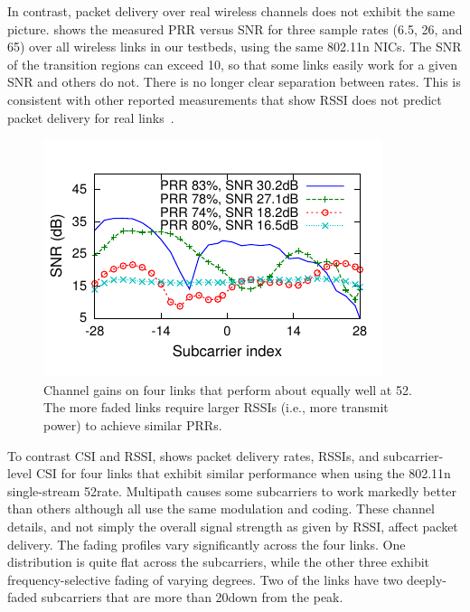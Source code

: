 In contrast, packet delivery over real wireless channels does not exhibit the same picture.  shows the measured PRR versus SNR for three sample rates (6.5, 26, and 65\Mbps) over all wireless links in our testbeds, using the same 802.11n NICs. The SNR of the transition regions can exceed 10\dB, so that some links easily work for a given SNR and others do not. There is no longer clear separation between rates. This is consistent with other reported measurements that show RSSI does not predict packet delivery for real links~\cite{aguayo_roofnet, reis_sigcomm06, snr_infocom08, zhao_sensys03}.

\begin{figure}[t]
  \centering
  \includegraphics[width=\columnwidth,viewport=2 9 185 108,clip]{figures/esnr/embed_fsf-shape-two-links.pdf}
  \caption{Channel gains on four links that perform about equally well at 52\Mbps. The more faded links require larger RSSIs (i.e., more transmit power) to achieve similar PRRs.}
  \label{fig:example_fsf_shape}

\end{figure}

To contrast CSI and RSSI,  shows packet delivery rates, RSSIs, and subcarrier-level CSI for four links that exhibit similar performance when using the 802.11n single-stream 52\Mbps rate. Multipath causes some subcarriers to work markedly better than others although all use the same modulation and coding. These channel details, and not simply the overall signal strength as given by RSSI, affect packet delivery. The fading profiles vary significantly across the four links. One distribution is quite flat across the subcarriers, while the other three exhibit frequency-selective fading of varying degrees. Two of the links have two deeply-faded subcarriers that are more than 20\dB down from the peak.

